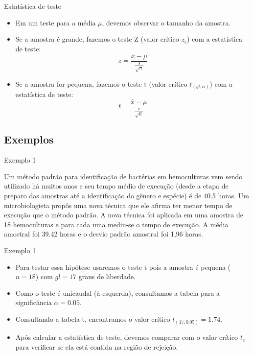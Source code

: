 \documentclass{beamer}
\begin{document}
\begin{frame}{Estatística de teste}
  \begin{itemize}
  \item Em um teste para a média $\mu$, devemos observar o tamanho da amostra.
  \item Se a amostra é grande, fazemos o teste Z (valor crítico $z_c$)
    com a estatística de teste:
    \begin{displaymath}
      z = \frac{\bar{x} - \mu}{\frac{s}{\sqrt{n}}}
    \end{displaymath}
  \item Se a amostra for pequena, fazemos o teste t (valor crítico
    $t_{(gl,\alpha)}$) com a estatística de teste:
    \begin{displaymath}
      t = \frac{\bar{x} - \mu}{\frac{s}{\sqrt{n}}}
    \end{displaymath}
  \end{itemize}
\end{frame}

\subsection{Exemplos}

\begin{frame}{Exemplo 1}
  \begin{example}
    Um método padrão para identificação de bactérias em hemoculturas
    vem sendo utilizado há muitos anos e seu tempo médio de execução
    (desde a etapa de preparo das amostras até a identificação do
    gênero e espécie) é de 40.5 horas. Um microbiologista propôs uma
    nova técnica que ele afirma ter menor tempo de execução que o
    método padrão. A nova técnica foi aplicada em uma amostra de 18
    hemoculturas e para cada uma mediu-se o tempo de execução. A média
    amostral foi 39.42 horas e o desvio padrão amostral foi 1,96
    horas.
  \end{example}
\end{frame}

\begin{frame}{Exemplo 1}
  \begin{itemize}
  \item Para testar essa hipótese usaremos o teste t pois a amostra é
    pequena ($n=18$) com \alert{$gl=17$} graus de liberdade.
  \item Como o teste é unicaudal (à esquerda), consultamos a tabela para a
    significância $\alpha = 0.05$.
  \item Consultando a tabela t, encontramos o valor crítico
    \alert{$t_{(17,0.05)} = 1.74$}.
  \item Após calcular a estatística de teste, devemos comparar com o
    valor crítico $t_c$ para verificar se ela está contida na região
    de rejeição.
  \end{itemize}
\end{frame}
\end{document}
